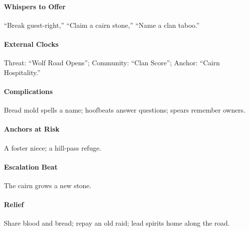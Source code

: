 \paragraph{Whispers to Offer} ``Break guest-right,'' ``Claim a cairn stone,'' ``Name a clan taboo.''
\paragraph{External Clocks} Threat: ``Wolf Road Opens''; Community: ``Clan Score''; Anchor: ``Cairn Hospitality.''
\paragraph{Complications} Bread mold spells a name; hoofbeats answer questions; spears remember owners.
\paragraph{Anchors at Risk} A foster niece; a hill-pass refuge.
\paragraph{Escalation Beat} The cairn grows a new stone.
\paragraph{Relief} Share blood and bread; repay an old raid; lead spirits home along the road.

